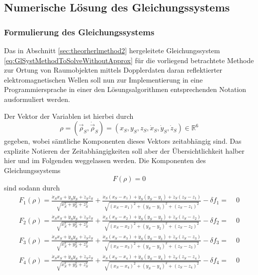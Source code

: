 \documentclass[a4paper,12pt]{article}
\numberwithin{equation}{section}
\begin{document}
\subsection{Numerische Lösung des Gleichungssystems}
\subsubsection{Formulierung des Gleichungssystems}
Das in Abschnitt \ref{sec:theorherlmethod2} hergeleitete Gleichungssystem \eqref{eq:GlSystMethodToSolveWithoutApprox} für die vorliegend betrachtete Methode zur Ortung von Raumobjekten mittels Dopplerdaten daran reflektierter elektromagnetischen Wellen soll nun zur Implementierung in eine Programmiersprache in einer den Lösungsalgorithmen entsprechenden Notation ausformuliert werden. 

Der Vektor der Variablen ist hierbei durch \begin{equation}
\rho = (\vec{\rho}_S,\dot{\vec{\rho}}_S) = (x_S,y_S,z_S,\dot{x}_S,\dot{y}_S,\dot{z}_S) \in \mathbb{R}^6
\end{equation} gegeben, wobei sämtliche Komponenten dieses Vektors zeitabhängig sind. Das explizite Notieren der Zeitabhängigkeiten soll aber der Übersichtlichkeit halber hier und im Folgenden weggelassen werden. Die Komponenten des Gleichungssystems \begin{equation}\label{eq:GlLoesShames}F(\rho)=0 \end{equation} sind sodann durch \small \begin{align}\label{eq:glsystshamesnonlin1}
F_1(\rho) = \frac{\dot{x}_Sx_S+\dot{y}_Sy_S+\dot{z}_Sz_S}{\sqrt{x_S^2 + y_S^2+z_S^2}}+
\frac{\dot{x}_S(x_S-x_1)+\dot{y}_S(y_S-y_1)+\dot{z}_S(z_S-z_1)}{\sqrt{(x_S-x_1)^2 + (y_S-y_1)^2+(z_S-z_1)^2}}  -  \delta f_1  =&\;  0 \\
F_2(\rho) = \frac{\dot{x}_Sx_S+\dot{y}_Sy_S+\dot{z}_Sz_S}{\sqrt{x_S^2 + y_S^2+z_S^2}}+
\frac{\dot{x}_S(x_S-x_2)+\dot{y}_S(y_S-y_2)+\dot{z}_S(z_S-z_2)}{\sqrt{(x_S-x_2)^2 + (y_S-y_2)^2+(z_S-z_2)^2}}  -  \delta f_2  =&\;  0 \\
F_3(\rho) = \frac{\dot{x}_Sx_S+\dot{y}_Sy_S+\dot{z}_Sz_S}{\sqrt{x_S^2 + y_S^2+z_S^2}}+ \frac{\dot{x}_S(x_S-x_3)+\dot{y}_S(y_S-y_3)+\dot{z}_S(z_S-z_3)}{\sqrt{(x_S-x_3)^2 + (y_S-y_3)^2+(z_S-z_3)^2}}  -  \delta f_3  =&\;  0 \\
F_4(\rho) = \frac{\dot{x}_Sx_S+\dot{y}_Sy_S+\dot{z}_Sz_S}{\sqrt{x_S^2 + y_S^2+z_S^2}}+ \frac{\dot{x}_S(x_S-x_4)+\dot{y}_S(y_S-y_4)+\dot{z}_S(z_S-z_4)}{\sqrt{(x_S-x_4)^2 + (y_S-y_4)^2+(z_S-z_4)^2}}  -  \delta f_4  =&\;  0 \\

\end{align}
\end{document}

